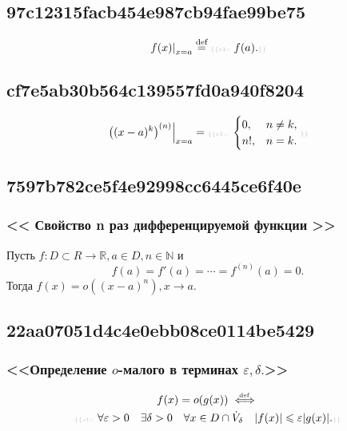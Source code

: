 \documentclass[11pt, a5paper]{article}
\newenvironment{note}[1]{\goodbreak\par\subsection{\hfill \color{lightgray}\tiny #1}}{}
\newenvironment{icloze}[2][\ldots]{%
  \ignorespaces\text{\tiny \color{lightgray} \{\{c#2:: }%
}{%
  \text{\tiny \color{lightgray}\}\}}\unskip%
}
\begin{document}
\begin{note}{97c12315facb454e987cb94fae99be75}
\[
    \left. f(x) \right|_{x = a} \overset{\text{def}}= \begin{icloze}{1}f(a).\end{icloze}
\]
\end{note}

\begin{note}{cf7e5ab30b564c139557fd0a940f8204}
    \[
        \left. \left((x - a)^{k} \right)^{(n)}  \right|_{x = a} =
        \begin{icloze}{1}
            \begin{cases}
                0, & n \neq k, \\
                n!, & n = k.
            \end{cases}
        \end{icloze}
    \]
\end{note}

\begin{note}{7597b782ce5f4e92998cc6445ce6f40e}
    \subsubsection{<<\begin{icloze}{3}Свойство n раз дифференцируемой функции\end{icloze}>>}

    Пусть \begin{icloze}{2}\( f : D \subset R \to \mathbb R, a \in D, n \in \mathbb N \) и \[
        f(a) = f'(a) = \cdots = f^{(n)} (a) = 0.
    \]\end{icloze}
    Тогда \begin{icloze}{1}\( f(x) = o((x - a)^{n} ),  x \to a \).\end{icloze}
\end{note}

\begin{note}{22aa07051d4c4e0ebb08ce0114be5429}
    \subsubsection{<<Определение \( o \)-малого в терминах \( \varepsilon, \delta. \)>>}

    \begin{multline*}
        f(x) = o(g(x)) \overset{\hspace{-1pt}\text{\tiny def}}\iff \\
        \begin{icloze}{1}
            \forall \varepsilon > 0 \quad \exists \delta > 0 \quad \forall x \in D \cap \dot V_{\delta} \quad |f(x)| \leqslant \varepsilon |g(x)|.
        \end{icloze}
    \end{multline*}
\end{note}
\end{document}
